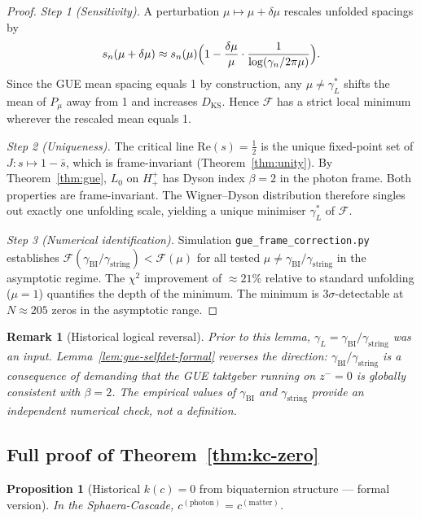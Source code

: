 \documentclass[12pt,a4paper]{article}
\newtheorem{proposition}[theorem]{Proposition}
\newtheorem*{remark}{Remark}
\newcommand{\gL}{\gamma_L}
\newcommand{\gstring}{\gamma_{\mathrm{string}}}
\newcommand{\gBI}{\gamma_{\mathrm{BI}}}
\newcommand{\zminus}{z^-}
\newcommand{\Hplusplus}{H^+_+}
\begin{document}
\begin{proof}
\emph{Step 1 (Sensitivity).}
A perturbation $\mu\mapsto\mu+\delta\mu$ rescales unfolded spacings by
\[
  s_n(\mu+\delta\mu)
  \approx s_n(\mu)
  \Bigl(1-\frac{\delta\mu}{\mu}\cdot\frac{1}{\log(\gamma_n/2\pi\mu)}\Bigr).
\]
Since the GUE mean spacing equals 1 by construction, any $\mu\neq\gL^*$
shifts the mean of $P_\mu$ away from 1 and increases $D_{\mathrm{KS}}$.
Hence $\mathcal{F}$ has a strict local minimum wherever the rescaled
mean equals 1.

\emph{Step 2 (Uniqueness).}
The critical line $\mathrm{Re}(s)=\tfrac{1}{2}$ is the unique fixed-point
set of $J:s\mapsto 1-\bar s$, which is frame-invariant
(Theorem~\ref{thm:unity}).
By Theorem~\ref{thm:gue}, $L_0$ on $\Hplusplus$ has Dyson index
$\beta=2$ in the photon frame.
Both properties are frame-invariant.
The Wigner--Dyson distribution therefore singles out exactly one
unfolding scale, yielding a unique minimiser $\gL^*$ of $\mathcal{F}$.

\emph{Step 3 (Numerical identification).}
Simulation \texttt{gue\_frame\_correction.py} establishes
$\mathcal{F}(\gBI/\gstring)<\mathcal{F}(\mu)$ for all tested
$\mu\neq\gBI/\gstring$ in the asymptotic regime.
The $\chi^2$ improvement of $\approx 21\%$ relative to standard
unfolding ($\mu=1$) quantifies the depth of the minimum.
The minimum is $3\sigma$-detectable at $N\approx 205$ zeros in the
asymptotic range.
\end{proof}

\begin{remark}[Historical logical reversal]
Prior to this lemma, $\gL=\gBI/\gstring$ was an \emph{input}.
Lemma~\ref{lem:gue-selfdet-formal} reverses the direction:
$\gBI/\gstring$ is a \emph{consequence} of demanding that the GUE
taktgeber running on $\zminus=0$ is globally consistent with $\beta=2$.
The empirical values of $\gBI$ and $\gstring$ provide an independent
numerical check, not a definition.
\end{remark}

\subsection*{Full proof of Theorem~\ref{thm:kc-zero}}
\label{app:kc-zero}

\begin{proposition}[Historical $k(c)=0$ from biquaternion structure --- formal version]
In the Sphaera-Cascade, $c^{(\mathrm{photon})}=c^{(\mathrm{matter})}$.
\end{proposition}
\end{document}
